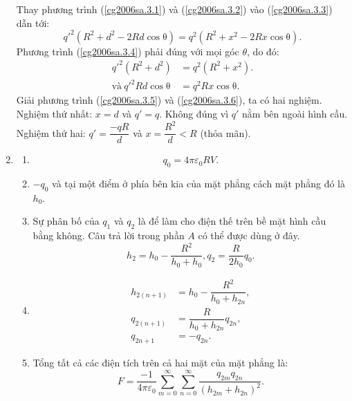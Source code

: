 \begin{loigiai}
\begin{enumerate}
\begin{center}
\begin{tikzpicture}[x=0.75pt,y=0.75pt,yscale=-1,xscale=1]
\end{tikzpicture}
    \end{center}
    Thay phương trình (\ref{cg2006sa.3.1}) và (\ref{cg2006sa.3.2}) vào (\ref{cg2006sa.3.3}) dẫn tới:
    \[q'^{2}(R^2+d^2-2Rd\mathrm{\cos{\theta}})=q^2(R^2+x^2-2Rx\mathrm{\cos{\theta}}). \tag{4} \label{cg2006sa.3.4}\]
    Phương trình (\ref{cg2006sa.3.4}) phải đúng với mọi góc $\theta$, do đó:
    \begin{align*}
       q'^{2}(R^2+d^2) &=q^2(R^2+x^2). \tag{5} \label{cg2006sa.3.5}\\
        \text{và}~q'^2Rd\mathrm{\cos{\theta}}&=q^2Rx\mathrm{\cos{\theta}}. \tag{6} \label{cg2006sa.3.6}
    \end{align*}
    Giải phương trình (\ref{cg2006sa.3.5}) và (\ref{cg2006sa.3.6}), ta có hai nghiệm.\\
    Nghiệm thứ nhất: $x=d$ và $q'=q$. Không đúng vì $q'$ nằm bên ngoài hình cầu.\\
    Nghiệm thứ hai: $q'=\dfrac{-qR}{d}$ và $x=\dfrac{R^2}{d}<R$ (thỏa mãn).
    \item 
    \begin{enumerate}[1) ]
        \item  \[q_0=4\pi\varepsilon_0RV.\]
        \item $-q_0$ và tại một điểm ở phía bên kia của mặt phẳng cách mặt phẳng đó là $h_0$. 
        \item Sự phân bố của $q_1$ và $q_2$ là để làm cho điện thế trên bề mặt hình cầu bằng không. Câu trả lời trong phần $A$ có thể được dùng ở đây.
        \[h_2=h_0-\dfrac{R^2}{h_0+h_0}, q_2=\dfrac{R}{2h_0}q_0.\]
        \item 
        \begin{align*}
            h_{2(n+1)}&=h_0-\dfrac{R^2}{h_0+h_{2n}},\\
            q_{2(n+1)}&=\dfrac{R}{h_0+h_{2n}}q_{2n},\\
            q_{2n+1}&=-q_{2n}.
        \end{align*}
        \item Tổng tất cả các điện tích trên cả hai mặt của mặt phẳng là:
        \[F=\dfrac{-1}{4\pi\varepsilon_0}\sum_{m=0}^{\infty}\sum_{n=0}^{\infty}\dfrac{q_{2m}q_{2n}}{(h_{2m}+h_{2n})^2}.\]
        

\end{enumerate}
\end{enumerate}
\end{loigiai}
